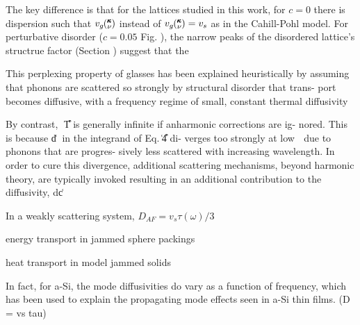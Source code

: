 \documentclass[aps,prb,onecolumn,preprint,superscriptaddress,amsmath,amssymb,floatfix]{revtex4}
\newcommand{\kv}{\mspace{-4.0mu}\left(\mspace{-8.0mu}
\begin{smallmatrix}&\pmb{\kappa} \\&\nu\end{smallmatrix}
\mspace{-3.0mu}\right)}
\begin{document}
The key difference is that for the lattices studied in this work, 
for $c=0$ there is dispersion such that $v_g\kv$ instead of 
$v_g\kv = v_s$ as in the Cahill-Pohl model. For perturbative 
disorder ($c=0.05$ Fig. ), the narrow peaks of the disordered 
lattice's structrue factor (Section ) suggest that the

This perplexing property of glasses
has been explained heuristically by assuming that phonons
are scattered so strongly by structural disorder that trans-
port becomes diffusive, with a frequency regime of small,
constant thermal diffusivity 
\cite{kittel_interpretation_1949,sheng_heat_1991}

By contrast,
␬͑T͒ is generally infinite if anharmonic corrections are ig-
nored. This is because d͑␻͒ in the integrand of Eq. ͑4͒ di-
verges too strongly at low ␻ due to phonons that are progres-
sively less scattered with increasing wavelength.
\cite{vitelli_heat_2010} 
In order to cure this divergence, additional scattering
mechanisms, beyond harmonic theory, are typically invoked
resulting in an additional contribution to the diffusivity,
dc͑␻͒






In a weakly scattering system, $D_{AF} = v_s \tau(\omega)/3$
\cite{xu_energy_2009}

energy transport in jammed sphere packings\cite{xu_energy_2009}

heat transport in model jammed solids\cite{vitelli_heat_2010}

In fact, for a-Si, the mode diffusivities do vary as a function 
of frequency,
\cite{feldman_thermal_1993,feldman_numerical_1999,allen_diffusons_1999} 
which has been used to explain the propagating 
mode effects seen in a-Si thin films. (D = vs tau)
\cite{he_heat_2011}
\end{document}
